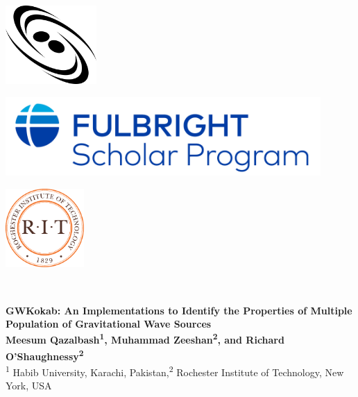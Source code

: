 \documentclass[a0,portrait]{a0poster}
\begin{document}
\begin{minipage}[b]{0.33\linewidth}
\raggedright
\includegraphics[height=3cm,valign=t]{assets/logos/ccrg-logo.png}
\end{minipage}
%
\begin{minipage}[b]{0.33\linewidth}
\centering
\includegraphics[height=3cm,valign=t]{assets/logos/full_bright_logo.pdf}
\end{minipage}
%
\begin{minipage}[b]{0.33\linewidth}
\raggedleft
\includegraphics[width=3cm,valign=t]{assets/logos/RIT_logo.pdf}
\end{minipage}\\

\vspace{3cm}
\begin{minipage}[h]{0.98\linewidth}
\centering \huge \color{HUPurple} \textbf{GWKokab: An Implementations to Identify the Properties of Multiple Population of Gravitational Wave Sources} \color{Black}\\ %
\Large \textbf{Meesum Qazalbash\textsuperscript{1}, Muhammad Zeeshan\textsuperscript{2}, and Richard O'Shaughnessy\textsuperscript{2}}\\ %
\normalsize \textsuperscript{1} Habib University, Karachi, Pakistan,\textsuperscript{2} Rochester Institute of Technology, New York, USA \\ %
\end{minipage}
\vspace{0.5cm}
\end{document}
